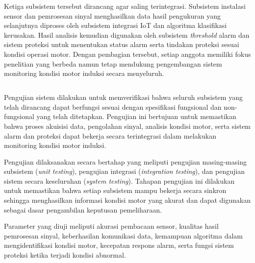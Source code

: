 \documentclass{elsinta}
\begin{document}
Ketiga subsistem tersebut dirancang agar saling
terintegrasi. Subsistem instalasi sensor dan 
pemrosesan sinyal menghasilkan data hasil 
pengukuran yang selanjutnya diproses oleh 
subsistem integrasi IoT dan algoritma 
klasifikasi kerusakan. Hasil analisis kemudian
 digunakan oleh subsistem \textit{threshold} 
 alarm dan sistem proteksi untuk menentukan 
 status alarm serta tindakan proteksi sesuai 
 kondisi operasi motor. 
 Dengan pembagian tersebut, setiap anggota 
 memiliki fokus penelitian yang berbeda 
 namun tetap mendukung pengembangan sistem monitoring kondisi motor induksi secara 
 menyeluruh.

\subsection{\SystemTestingTitle}

Pengujian sistem dilakukan untuk memverifikasi bahwa seluruh subsistem yang telah dirancang dapat berfungsi sesuai dengan spesifikasi fungsional dan non-fungsional yang telah ditetapkan. Pengujian ini bertujuan untuk memastikan bahwa proses akuisisi data, pengolahan sinyal, analisis kondisi motor, serta sistem alarm dan proteksi dapat bekerja secara terintegrasi dalam melakukan monitoring kondisi motor induksi.

Pengujian dilaksanakan secara bertahap yang meliputi pengujian masing-masing subsistem (\textit{unit testing}), pengujian integrasi (\textit{integration testing}), dan pengujian sistem secara keseluruhan (\textit{system testing}). Tahapan pengujian ini dilakukan untuk memastikan bahwa setiap subsistem mampu bekerja secara sinkron sehingga menghasilkan informasi kondisi motor yang akurat dan dapat digunakan sebagai dasar pengambilan keputusan pemeliharaan.

Parameter yang diuji meliputi akurasi pembacaan sensor, kualitas hasil pemrosesan sinyal, keberhasilan komunikasi data, kemampuan algoritma dalam mengidentifikasi kondisi motor, kecepatan respons alarm, serta fungsi sistem proteksi ketika terjadi kondisi abnormal.
\end{document}

